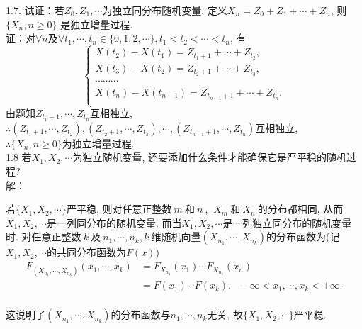 1.7. 试证：若$Z_0, Z_1,\cdots $为独立同分布随机变量, 定义$ X_n = Z_0 + Z_1 + \cdots + Z_n$, 则$\{X_n, n \geqslant 0\}$ 是独立增量过程.\\
	证：对$\forall n$及$\forall t_1, \cdots, t_n\in \{0,1,2,\cdots\}, t_1 < t_2 < \cdots < t_n$, 有
	\[
	\begin{cases}
		X(t_2) - X(t_1) = Z_{t_1+1}+\cdots+Z_{t_2},\\
		X(t_3) - X(t_2) = Z_{t_2+1}+\cdots+Z_{t_3},\\
		\cdots\cdots\cdots\\
		X(t_n) - X(t_{n-1}) = Z_{t_{n-1}+1}+\cdots+Z_{t_n}.\\
	\end{cases}
	\]
	由题知$Z_{t_1+1}, \cdots, Z_{t_n}$互相独立, \\
	$\therefore(Z_{t_1+1},\cdots,Z_{t_2}),(Z_{t_2+1},\cdots,Z_{t_3}),\cdots,(Z_{t_{n-1}+1},\cdots,Z_{t_n})$互相独立,\\
	$\therefore \{X_n, n \geqslant 0\}$为独立增量过程.\\


1.8 若$X_1, X_2,\cdots $为独立随机变量, 还要添加什么条件才能确保它是严平稳的随机过程? \\
	解：

	若$\{X_1, X_2, \cdots \}$严平稳, 则对任意正整数$~m~$和$~n~$, $~X_m~$和$~X_n~$的分布都相同, 从而$X_1, X_2, \cdots $是一列同分布的随机变量. 而当$X_1, X_2, \cdots $是一列独立同分布的随机变量时. 对任意正整数$~k~$及$~n_1, \cdots,n_k, k~$维随机向量$\left(X_{n_1}, \cdots, X_{n_k}\right)$的分布函数为(记$X_1, X_2, \cdots $的共同分布函数为$F(x)$)\\
	\[
	\begin{split}
	F_{\left(X_{n_1}, \cdots, X_{n_k}\right)}(x_1, \cdots, x_k) & = F_{X_{n_1}}(x_1)\cdots F_{X_{n_k}}(x_n)\\
											& = F(x_1)\cdots F(x_k).~~~-\infty < x_1,\cdots,x_k < +\infty.\\
	\end{split}
	\]
	\begin{center}
	这说明了$(X_{n_1},\cdots,X_{n_k})$的分布函数与$n_1, \cdots, n_k$无关, 故$\{X_1, X_2, \cdots\}$严平稳.\\
	\end{center}
	

